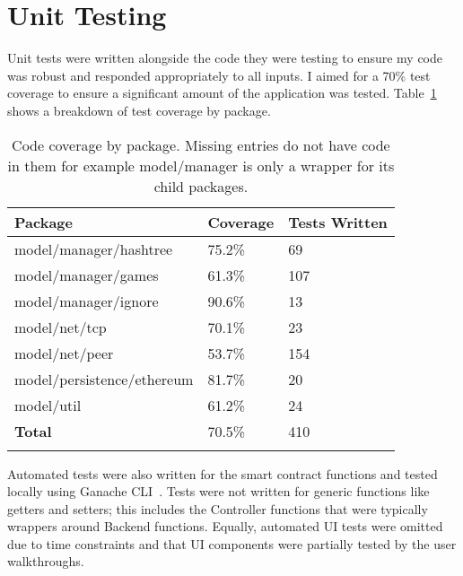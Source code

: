 \section{Unit Testing}

Unit tests were written alongside the code they were testing to ensure my code was robust and responded appropriately to all inputs. I aimed for a 70\% test coverage to ensure a significant amount of the application was tested. Table~\ref{tab:coverage} shows a breakdown of test coverage by package.

\begin{longtable}{p{} p{} p{}}
  \toprule
  \textbf{Package} & \textbf{Coverage} & \textbf{Tests Written}
  \\\midrule\midrule
  model/manager/hashtree
  & 75.2\%
  & 69
  \\
  model/manager/games
  & 61.3\%
  & 107
  \\
  model/manager/ignore
  & 90.6\%
  & 13
  \\
  model/net/tcp
  & 70.1\%
  & 23
  \\
  model/net/peer
  & 53.7\%
  & 154
  \\
  model/persistence/ethereum
  & 81.7\%
  & 20
  \\
  model/util
  & 61.2\%
  & 24
  \\\midrule\midrule
  \textbf{Total}
  & 70.5\%
  & 410
  \\\bottomrule\bottomrule
  \caption{Code coverage by package. Missing entries do not have code in them for example model/manager is only a wrapper for its child packages.}
  \label{tab:coverage}
\end{longtable}

\newparagraph
Automated tests were also written for the smart contract functions and tested locally using Ganache CLI~\cite{noauthor_trufflesuiteganache_2023}. 
Tests were not written for generic functions like getters and setters; this includes the Controller functions that were typically wrappers around Backend functions. Equally, automated UI tests were omitted due to time constraints and that UI components were partially tested by the user walkthroughs.